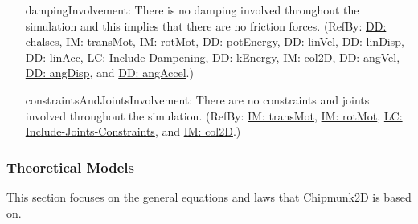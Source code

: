 \documentclass[12pt]{article}
\begin{document}
\begin{itemize}
\item[dampingInvolvement:\phantomsection\label{assumpDI}]{There is no damping involved throughout the simulation and this implies that there are no friction forces. (RefBy: \hyperref[DD:chalses]{DD: chalses}, \hyperref[IM:transMot]{IM: transMot}, \hyperref[IM:rotMot]{IM: rotMot}, \hyperref[DD:potEnergy]{DD: potEnergy}, \hyperref[DD:linVel]{DD: linVel}, \hyperref[DD:linDisp]{DD: linDisp}, \hyperref[DD:linAcc]{DD: linAcc}, \hyperref[lcID]{LC: Include-Dampening}, \hyperref[DD:kEnergy]{DD: kEnergy}, \hyperref[IM:col2D]{IM: col2D}, \hyperref[DD:angVel]{DD: angVel}, \hyperref[DD:angDisp]{DD: angDisp}, and \hyperref[DD:angAccel]{DD: angAccel}.)}
\item[constraintsAndJointsInvolvement:\phantomsection\label{assumpCAJI}]{There are no constraints and joints involved throughout the simulation. (RefBy: \hyperref[IM:transMot]{IM: transMot}, \hyperref[IM:rotMot]{IM: rotMot}, \hyperref[lcIJC]{LC: Include-Joints-Constraints}, and \hyperref[IM:col2D]{IM: col2D}.)}
\end{itemize}
\subsubsection{Theoretical Models}
\label{Sec:TMs}
This section focuses on the general equations and laws that Chipmunk2D is based on.
\par~
\end{document}
